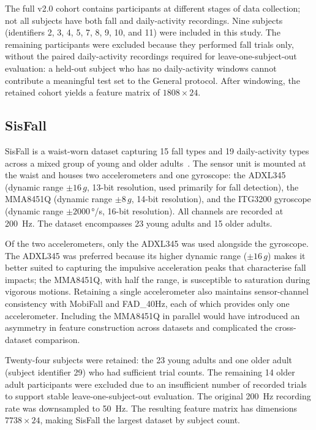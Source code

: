 \documentclass[onluarkali,ingilizce,yukseklisans,karton,LisansustuEgitim]{itutez}
\providecommand{\1}{\mathbf{1}}
\begin{document}
The full v2.0 cohort contains participants at different stages of data collection; not all subjects have both fall and daily-activity recordings. Nine subjects (identifiers 2, 3, 4, 5, 7, 8, 9, 10, and 11) were included in this study. The remaining participants were excluded because they performed fall trials only, without the paired daily-activity recordings required for leave-one-subject-out evaluation: a held-out subject who has no daily-activity windows cannot contribute a meaningful test set to the General protocol. After windowing, the retained cohort yields a feature matrix of $1808 \times 24$.

\subsection{SisFall}
\label{subsubsec:sisfall}

SisFall is a waist-worn dataset capturing 15 fall types and 19 daily-activity types across a mixed group of young and older adults~\parencite{sisfall}. The sensor unit is mounted at the waist and houses two accelerometers and one gyroscope: the ADXL345 (dynamic range $\pm 16\,g$, 13-bit resolution, used primarily for fall detection), the MMA8451Q (dynamic range $\pm 8\,g$, 14-bit resolution), and the ITG3200 gyroscope (dynamic range $\pm 2000$\,°/s, 16-bit resolution). All channels are recorded at 200~Hz. The dataset encompasses 23 young adults and 15 older adults.

Of the two accelerometers, only the ADXL345 was used alongside the gyroscope. The ADXL345 was preferred because its higher dynamic range ($\pm 16\,g$) makes it better suited to capturing the impulsive acceleration peaks that characterise fall impacts; the MMA8451Q, with half the range, is susceptible to saturation during vigorous motions. Retaining a single accelerometer also maintains sensor-channel consistency with MobiFall and FAD\_40Hz, each of which provides only one accelerometer. Including the MMA8451Q in parallel would have introduced an asymmetry in feature construction across datasets and complicated the cross-dataset comparison.

Twenty-four subjects were retained: the 23 young adults and one older adult (subject identifier 29) who had sufficient trial counts. The remaining 14 older adult participants were excluded due to an insufficient number of recorded trials to support stable leave-one-subject-out evaluation. The original 200~Hz recording rate was downsampled to 50~Hz. The resulting feature matrix has dimensions $7738 \times 24$, making SisFall the largest dataset by subject count.
\end{document}
